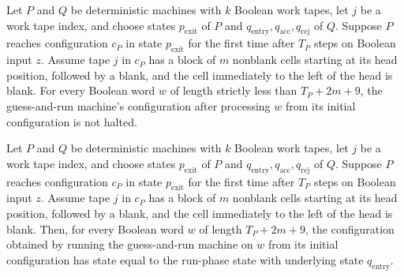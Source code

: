 \begin{theorem}
\label{Turing.guessRunTM_runWith_live}
\leanok
{}
Let $P$ and $Q$ be deterministic machines with $k$ Boolean work tapes, let $j$ be a work
tape index, and choose states $p_{\mathrm{exit}}$ of $P$ and
$q_{\mathrm{entry}},q_{\mathrm{acc}},q_{\mathrm{rej}}$ of $Q$. Suppose $P$ reaches
configuration $c_P$ in state $p_{\mathrm{exit}}$ for the first time after $T_P$ steps on
Boolean input $z$. Assume tape $j$ in $c_P$ has a block of $m$ nonblank cells starting
at its head position, followed by a blank, and the cell immediately to the left of the
head is blank. For every Boolean word $w$ of length strictly less than $T_P+2m+9$, the
guess-and-run machine's configuration after processing $w$ from its initial
configuration is not halted.
\end{theorem}

\begin{theorem}
\label{Turing.guessRunTM_runWith_handoff_state}
\leanok
{}
Let $P$ and $Q$ be deterministic machines with $k$ Boolean work tapes, let $j$ be a work
tape index, and choose states $p_{\mathrm{exit}}$ of $P$ and
$q_{\mathrm{entry}},q_{\mathrm{acc}},q_{\mathrm{rej}}$ of $Q$. Suppose $P$ reaches
configuration $c_P$ in state $p_{\mathrm{exit}}$ for the first time after $T_P$ steps on
Boolean input $z$. Assume tape $j$ in $c_P$ has a block of $m$ nonblank cells starting
at its head position, followed by a blank, and the cell immediately to the left of the
head is blank. Then, for every Boolean word $w$ of length $T_P+2m+9$, the configuration
obtained by running the guess-and-run machine on $w$ from its initial configuration has
state equal to the run-phase state with underlying state $q_{\mathrm{entry}}$.
\end{theorem}

